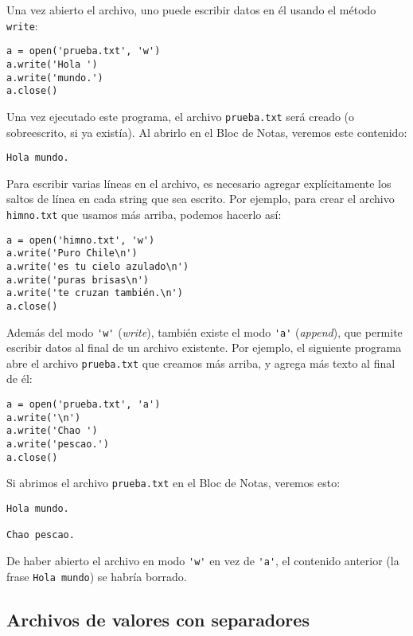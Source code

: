 Una vez abierto el archivo, uno puede escribir datos en él usando el
método \lstinline!write!:

\begin{lstlisting}
a = open('prueba.txt', 'w')
a.write('Hola ')
a.write('mundo.')
a.close()
\end{lstlisting}

Una vez ejecutado este programa, el archivo \lstinline!prueba.txt! será
creado (o sobreescrito, si ya existía). Al abrirlo en el Bloc de Notas,
veremos este contenido:

\begin{lstlisting}
Hola mundo.
\end{lstlisting}

Para escribir varias líneas en el archivo, es necesario agregar
explícitamente los saltos de línea en cada string que sea escrito. Por
ejemplo, para crear el archivo \lstinline!himno.txt! que usamos más
arriba, podemos hacerlo así:

\begin{lstlisting}
a = open('himno.txt', 'w')
a.write('Puro Chile\n')
a.write('es tu cielo azulado\n')
a.write('puras brisas\n')
a.write('te cruzan también.\n')
a.close()
\end{lstlisting}

Además del modo \lstinline!'w'! (\emph{write}), también existe el modo
\lstinline!'a'! (\emph{append}), que permite escribir datos al final de
un archivo existente. Por ejemplo, el siguiente programa abre el archivo
\lstinline!prueba.txt! que creamos más arriba, y agrega más texto al
final de él:

\begin{lstlisting}
a = open('prueba.txt', 'a')
a.write('\n')
a.write('Chao ')
a.write('pescao.')
a.close()
\end{lstlisting}

Si abrimos el archivo \lstinline!prueba.txt! en el Bloc de Notas,
veremos esto:

\begin{lstlisting}
Hola mundo.

Chao pescao.
\end{lstlisting}

De haber abierto el archivo en modo \lstinline!'w'! en vez de
\lstinline!'a'!, el contenido anterior (la frase \lstinline!Hola mundo!)
se habría borrado.

\subsection{Archivos de valores con separadores}

